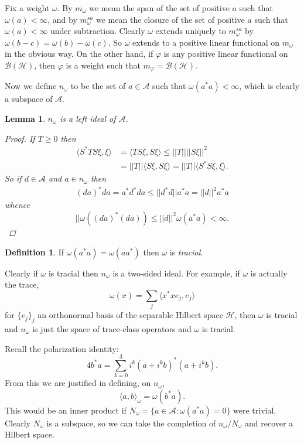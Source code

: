 \documentclass[12pt]{report}
\newtheorem{lemma}[theorem]{Lemma}
\theoremstyle{definition}
\newtheorem{definition}[theorem]{Definition}
\begin{document}
Fix a weight $\omega$. By $m_\omega$ we mean the span of the set of positive $a$ such that $\omega(a) < \infty$, and by $m_\omega^{sa}$ we mean the closure of the set of positive $a$ such that $\omega(a) < \infty$ under subtraction. Clearly $\omega$ extends uniquely to $m_\omega^{sa}$ by $\omega(b-c) = \omega(b) - \omega(c)$. So $\omega$ extends to a positive linear functional on $m_\omega$ in the obvious way. On the other hand, if $\varphi$ is any positive linear functional on $\mathcal B(\mathcal H)$, then $\varphi$ is a weight such that $m_\varphi = \mathcal B(\mathcal H)$.

Now we define $n_\omega$ to be the set of $a \in \mathcal A$ such that $\omega(a^*a) < \infty$, which is clearly a subspace of $\mathcal A$.
\begin{lemma}
    $n_\omega$ is a left ideal of $\mathcal A$.
\begin{proof}
    If $T \geq 0$ then
    \begin{align*}
        \langle S^*TS\xi, \xi\rangle
            &= \langle TS\xi, S\xi\rangle
            \leq ||T|| ||S\xi||^2\\
            &= ||T|| \langle S\xi, S\xi\rangle
            = ||T|| \langle S^*S\xi, \xi\rangle.
    \end{align*}
    So if $d \in \mathcal A$ and $a \in n_\omega$ then
    \begin{align*}
        (da)^*da = a^*d^*da \leq ||d^*d|| a^*a = ||d||^2 a^*a
    \end{align*}
    whence
    $$||\omega((da)^*(da)) \leq ||d||^2 \omega(a^*a) < \infty.$$
\end{proof}
\end{lemma}
\begin{definition}
If $\omega(a^*a) = \omega(aa^*)$ then $\omega$ is \emph{tracial}.
\end{definition}
Clearly if $\omega$ is tracial then $n_\omega$ is a two-sided ideal. For example, if $\omega$ is actually the trace,
$$\omega(x) = \sum_j \langle x^*xe_j, e_j\rangle$$
for $\{e_j\}_j$ an orthonormal basis of the separable Hilbert space $\mathcal H$, then $\omega$ is tracial and $n_\omega$ is just the space of trace-class operators and $\omega$ is tracial.

Recall the polarization identity:
$$4b^*a = \sum_{k=0}^3 i^k(a+i^kb)^*(a+i^kb).$$
From this we are justified in defining, on $n_\omega$,
$$\langle a, b\rangle_\omega = \omega(b^*a).$$
This would be an inner product if $N_\omega = \{a \in \mathcal A: \omega(a^*a) = 0\}$ were trivial. Clearly $N_\omega$ is a subspace, so we can take the completion of $n_\omega/N_\omega$ and recover a Hilbert space.
\end{document}
